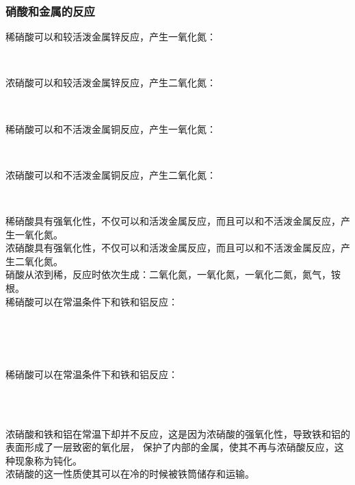 \documentclass[UTF8]{ctexart}
\begin{document}
\subsubsection{硝酸和金属的反应}
    稀硝酸可以和较活泼金属锌反应，产生一氧化氮：
    \begin{center}
        \\[6mm]
    \end{center}
    浓硝酸可以和较活泼金属锌反应，产生二氧化氮：
    \begin{center}
        \\[6mm]
    \end{center}
    稀硝酸可以和不活泼金属铜反应，产生一氧化氮：
    \begin{center}
        \\[6mm]
    \end{center}
    浓硝酸可以和不活泼金属铜反应，产生二氧化氮：
    \begin{center}
        \\[6mm]
    \end{center}
    稀硝酸具有强氧化性，不仅可以和活泼金属反应，而且可以和不活泼金属反应，产生一氧化氮。\\[3mm]
    浓硝酸具有强氧化性，不仅可以和活泼金属反应，而且可以和不活泼金属反应，产生二氧化氮。\\[3mm]
    硝酸从浓到稀，反应时依次生成：二氧化氮，一氧化氮，一氧化二氮，氮气，铵根。\\[10mm]
    稀硝酸可以在常温条件下和铁和铝反应：
    \begin{center}
        \\[3mm]
        \\[3mm]
        \\[6mm]
    \end{center}
    稀硝酸可以在常温条件下和铁和铝反应：
    \begin{center}
        \\[3mm]
        \\[6mm]
    \end{center}
    浓硝酸和铁和铝在常温下却并不反应，这是因为浓硝酸的强氧化性，导致铁和铝的表面形成了一层致密的氧化层，
    保护了内部的金属，使其不再与浓硝酸反应，这种现象称为钝化。\\[3mm]
    浓硝酸的这一性质使其可以在冷的时候被铁筒储存和运输。
\end{document}
